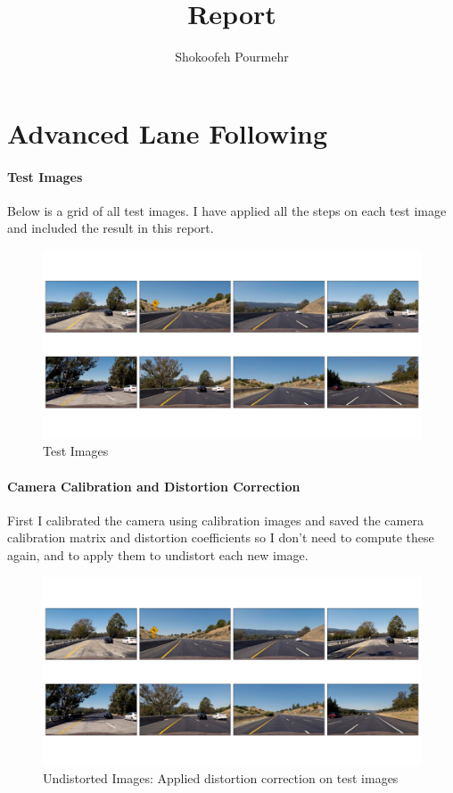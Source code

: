 \documentclass[12pt,a4paper,onecolumn]{report}
\title{Report}
\begin{document}
\author{Shokoofeh Pourmehr}
\chapter*{Advanced Lane Following}
\subsubsection*{Test Images}
Below is a grid of all test images. I have applied all the steps on each test image and included the result in this report.

\begin{figure}[H]
\centering
\includegraphics[width=\textwidth]{output_images/grid_images/grid_test_images.jpg}
\caption{Test Images}
\end{figure}

\subsubsection*{Camera Calibration and Distortion Correction}
First I calibrated the camera using calibration images and saved the camera calibration matrix and distortion coefficients so I don't need to compute these again, and to apply them to undistort each new image.

\begin{figure}[H]
\centering
\includegraphics[width=\textwidth]{output_images/grid_images/grid_undistorted_images.jpg}
\caption{Undistorted Images: Applied distortion correction on test images}
\end{figure}
\end{document}

